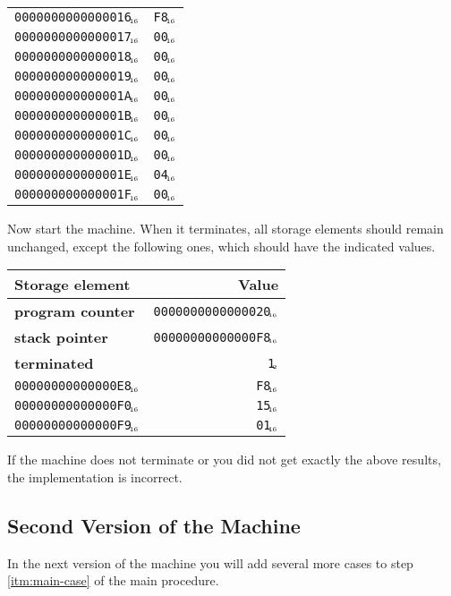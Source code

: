 \documentclass[a4paper,12pt]{article}
\newcommand{\num}[1]{\texttt{#1}\xspace}
\newcommand{\hex}[1]{\num{#1}$_{\textup{\tiny\hskip-1ex 16}}$\xspace}
\newcommand{\bin}[1]{\num{#1}$_{\textup{\tiny\hskip-1ex 2}}$\xspace}
\newcommand{\PC}{\textbf{program counter}\xspace}
\newcommand{\SP}{\textbf{stack pointer}\xspace}
\newcommand{\TERM}{\textbf{terminated}\xspace}
\newcommand{\T}{\bin{1}}
\begin{document}
\begin{center}
\begin{tabular}{@{}ll@{}}
    \hex{0000000000000016} & \hex{F8} \\
    \hex{0000000000000017} & \hex{00} \\
    \hex{0000000000000018} & \hex{00} \\
    \hex{0000000000000019} & \hex{00} \\
    \hex{000000000000001A} & \hex{00} \\
    \hex{000000000000001B} & \hex{00} \\
    \hex{000000000000001C} & \hex{00} \\
    \hex{000000000000001D} & \hex{00} \\
    \hex{000000000000001E} & \hex{04} \\
    \hex{000000000000001F} & \hex{00} \\
    \hline
  \end{tabular}
\end{center}

Now start the machine.
When it terminates, all storage elements should remain unchanged, except the following ones, which should have the indicated values.

\begin{center}
  \begin{tabular}{@{}lr@{}}
    \hline
    Storage element        & Value                   \\
    \hline
    \PC                    & \hex{0000000000000020}  \\
    \SP                    & \hex{00000000000000F8}  \\
    \TERM                  & \T                      \\
    \hex{00000000000000E8} & \hex{F8} \\
    \hex{00000000000000F0} & \hex{15} \\
    \hex{00000000000000F9} & \hex{01} \\
    \hline
  \end{tabular}
\end{center}

If the machine does not terminate or you did not get exactly the above results, the implementation is incorrect.

\subsection{Second Version of the Machine}

In the next version of the machine you will add several more cases to step \ref{itm:main-case} of the main procedure.
\end{document}
